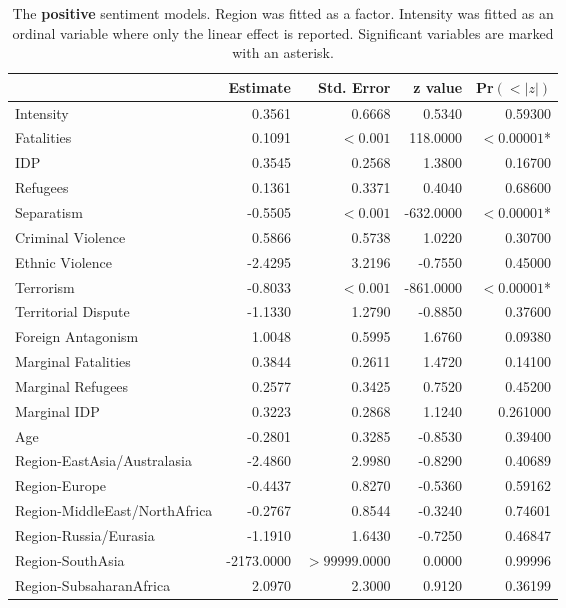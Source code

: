 \begin{table}
\centering
\begin{tabular}{l|rrrr}
& Estimate                    & Std. Error & z value & Pr$(<|z|)$  \\ \hline
Intensity                   & 0.3561 & 0.6668 & 0.5340 & 0.59300 \\ 
Fatalities                    & 0.1091 &  $<0.001$ & 118.0000 & $<0.00001$* \\ 
IDP                           & 0.3545 & 0.2568 & 1.3800 & 0.16700 \\ 
Refugees                      & 0.1361 & 0.3371 & 0.4040 & 0.68600 \\ 
Separatism                    & -0.5505 & $<0.001$ & -632.0000 & $<0.00001$* \\ 
Criminal Violence             & 0.5866 & 0.5738 & 1.0220 & 0.30700 \\ 
Ethnic Violence               & -2.4295 & 3.2196 & -0.7550 & 0.45000 \\ Terrorism                     & -0.8033 & $<0.001$ & -861.0000 &  $<0.00001$* \\ 
Territorial Dispute           & -1.1330 & 1.2790 & -0.8850 & 0.37600 \\ 
Foreign Antagonism            & 1.0048 & 0.5995 & 1.6760 & 0.09380 \\ 
Marginal Fatalities           & 0.3844 & 0.2611 & 1.4720 & 0.14100 \\ 
Marginal Refugees             & 0.2577 & 0.3425 & 0.7520 & 0.45200 \\ 
Marginal IDP                  & 0.3223 & 0.2868 & 1.1240 & 0.261000 \\ 
Age                           & -0.2801 & 0.3285 & -0.8530 & 0.39400 \\ 
Region-EastAsia/Australasia     & -2.4860 & 2.9980 & -0.8290 & 0.40689 \\ 
Region-Europe                 & -0.4437 &  0.8270 & -0.5360 & 0.59162 \\ 
Region-MiddleEast/NorthAfrica & -0.2767 & 0.8544 & -0.3240 & 0.74601 \\ 
Region-Russia/Eurasia         & -1.1910 & 1.6430 & -0.7250 & 0.46847 \\ 
Region-SouthAsia              & -2173.0000 & $>99999.0000$ & 0.0000 & 0.99996 \\ 
Region-SubsaharanAfrica       & 2.0970 & 2.3000 & 0.9120 & 0.36199  
\end{tabular}
\caption{The \textbf{positive} sentiment models. Region was fitted as a factor. Intensity was fitted as an ordinal variable where only the linear effect is reported. Significant variables are marked with an asterisk.}
\label{posfix}
\end{table}

